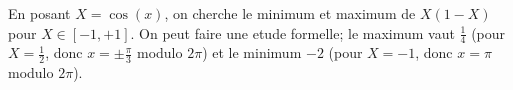 En posant $X=\cos(x)$, on cherche le minimum et maximum de $X(1-X)$ pour $X\in[-1,+1]$. On peut faire une etude formelle; le maximum vaut $\frac{1}{4}$ (pour $X=\frac{1}{2}$, donc $x=\pm \frac{\pi}{3}$ modulo $2\pi$) et le minimum $-2$ (pour $X=-1$, donc $x=\pi$ modulo $2\pi$).
